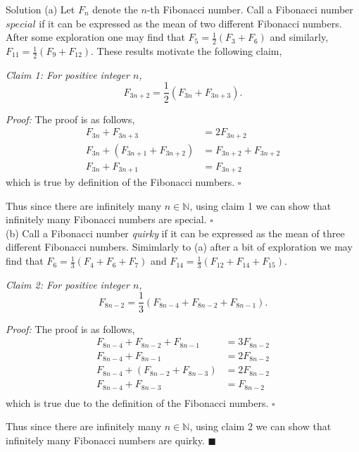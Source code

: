 \documentclass{article}
\begin{document}
\begin{solution}{Solution}
(a) Let $F_n$ denote the $n$-th Fibonacci number. Call a Fibonacci number
$\textit{special}$ if it can be expressed as the mean of two different
Fibonacci numbers.
After some exploration
one may find that $F_5 = \frac12 (F_3 + F_6)$ and similarly,
$F_{11} = \frac12 (F_9 + F_{12})$. These results motivate the following
claim, \vspace{0.2cm}

\textit{Claim 1: For positive integer $n$,
$$
F_{3n + 2} = \frac12 (F_{3n} + F_{3n+3}).
$$}

\textit{Proof:} The proof is as follows,
\[
\begin{aligned}
F_{3n} + F_{3n+3} &= 2F_{3n+2} \\
F_{3n} + (F_{3n+1} + F_{3n+2}) &= F_{3n+2} + F_{3n+2}\\
F_{3n} + F_{3n+1} &= F_{3n+2}
\end{aligned}
\]
which is true by definition of the Fibonacci numbers. $\square$
\vspace{0.2cm}

Thus since there are infinitely many $n \in \mathbb{N}$, using claim 1
we can show that infinitely many Fibonacci numbers are special. $\square$
\\

(b) Call a Fibonacci number \textit{quirky} if it can be expressed as the
mean of three different Fibonacci numbers. Simimlarly to (a) after a bit
of exploration we may find that
$F_6 = \frac13 (F_4 + F_6 + F_7)$ and
$F_{14} = \frac13 (F_{12} + F_{14} + F_{15})$. \vspace{0.2cm}

\textit{Claim 2: For positive integer $n$,
$$
F_{8n-2} = \frac13 (F_{8n-4} + F_{8n-2} + F_{8n-1}).
$$
}

\textit{Proof:} The proof is as follows,
\[
\begin{aligned}
F_{8n-4} + F_{8n-2} + F_{8n-1} &= 3F_{8n-2}\\
F_{8n-4} + F_{8n-1} &= 2F_{8n-2}\\
F_{8n-4} + (F_{8n-2} + F_{8n-3}) &= 2F_{8n-2}\\
F_{8n-4} + F_{8n-3} &= F_{8n-2}\\
\end{aligned}
\]
which is true due to the definition of the Fibonacci numbers. $\square$

Thus since there are infinitely many $n \in \mathbb{N}$, using claim 2
we can show that infinitely many Fibonacci numbers are quirky.
$\blacksquare$
\end{solution}
\newpage
\end{document}
